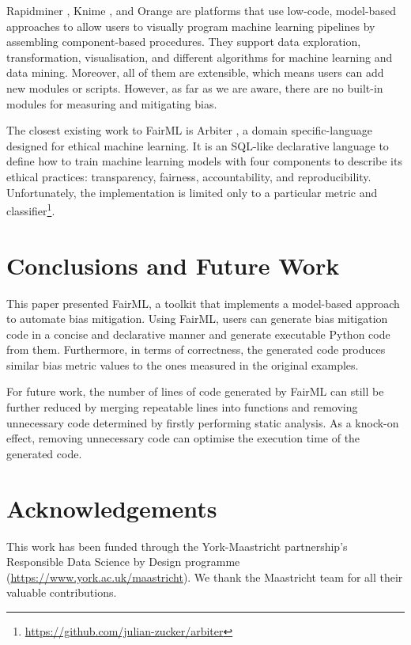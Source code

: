 \documentclass[sigconf]{acmart}
\begin{document}
{	Rapidminer \cite{hofmann2016rapidminer}, Knime \cite{berthold2008knime}, and Orange \cite{demsar2013orange} are platforms that use low-code, model-based approaches to allow users to visually program machine learning pipelines by assembling component-based procedures. They support data exploration, transformation, visualisation, and different algorithms for machine learning and data mining. Moreover, all of them are extensible, which means users can add new modules or scripts. However, as far as we are aware, there are no built-in modules for measuring and mitigating bias. 
	
	The closest existing work to FairML is Arbiter \cite{zucker2020arbiter}, a domain specific-language designed for ethical machine learning. It is an SQL-like declarative language to define how to train machine learning models with four components to describe its ethical practices: transparency, fairness, accountability, and reproducibility. Unfortunately, the implementation is limited only to a particular metric and classifier\footnote{\url{https://github.com/julian-zucker/arbiter}}.
	
	\section{Conclusions and Future Work}
	\label{sec:conclusions_and_future_work}
	This paper presented FairML, a toolkit that implements a model-based approach to automate bias mitigation. Using FairML, users can generate bias mitigation code in a concise and declarative manner and generate executable Python code from them. Furthermore, in terms of correctness, the generated code produces similar bias metric values to the ones measured in the original examples.
	
	For future work, the number of lines of code generated by FairML can still be further reduced by merging repeatable lines into functions and removing unnecessary code determined by firstly performing static analysis. 
	As a knock-on effect, removing unnecessary code can optimise the execution time of the generated code.
	
	\section{Acknowledgements}
	\label{sec:acknowledgements}
	This work has been funded through the York-Maastricht partnership's Responsible Data Science by Design programme (\url{https://www.york.ac.uk/maastricht}). We thank the Maastricht team for all their valuable contributions.
	
}
\end{document}
